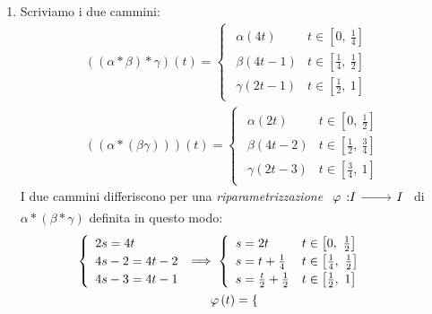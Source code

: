 \begin{demonstration}~{}
\begin{enumerate}[label=\Roman*]
	\item Scriviamo i due cammini:
	\begin{gather*}
\left(\left(\alpha\ast\beta\right)\ast\gamma\right)\left(t\right)=\begin{cases}
	\begin{array}{ll}
		\alpha\left(4t\right)&t\in\left[0,\ \frac{1}{4}\right]\\
		\beta\left(4t-1\right)&t\in\left[\frac{1}{4},\ \frac{1}{2}\right]\\
		\gamma\left(2t-1\right)&t\in\left[\frac{1}{2},\ 1\right]
	\end{array}
\end{cases}\\
\left(\left(\alpha\ast\left(\beta\gamma\right)\right)\right)\left(t\right)=\begin{cases}
\begin{array}{ll}
	\alpha\left(2t\right)&t\in\left[0,\ \frac{1}{2}\right]\\
	\beta\left(4t-2\right)&t\in\left[\frac{1}{2},\ \frac{3}{4}\right]\\
	\gamma\left(2t-3\right)&t\in\left[\frac{3}{4},\ 1\right]
\end{array}
\end{cases}
	\end{gather*}
I due cammini differiscono per una \textit{riparametrizzazione} $\funz{\oldphi}{I}{I}$ di $\alpha\ast\left(\beta\ast\gamma\right)$ definita in questo modo:
\begin{gather*}
	\begin{cases}
		\begin{array}{l}
			2s=4t\\
			4s-2=4t-2\\
			4s-3=4t-1
		\end{array}
\implies
\begin{cases}
\begin{array}{ll}
	s=2t&t\in\left[0,\ \frac{1}{2}\right]\\
	s=t+\frac{1}{4}&t\in\left[\frac{1}{4},\ \frac{1}{2}\right]\\
	s=\frac{t}{2}+\frac{1}{2}&t\in\left[\frac{1}{2},\ 1\right]
\end{array}
		\end{cases}
	\end{cases}\\
\oldphi\left(t\right)=	\begin{cases}

\end{cases}
\end{gather*}
\end{enumerate}
\end{demonstration}
